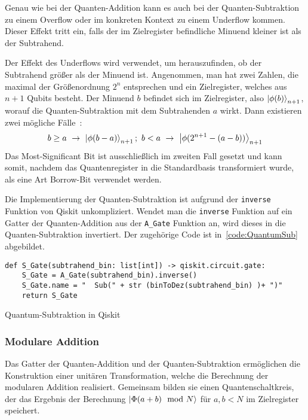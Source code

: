 Genau wie bei der Quanten-Addition kann es auch bei der Quanten-Subtraktion zu einem Overflow
oder im konkreten Kontext zu einem Underflow kommen.
Dieser Effekt tritt ein, 
falls der im Zielregister befindliche Minuend kleiner ist als der Subtrahend.

Der Effekt des Underflows wird verwendet, um herauszufinden, 
ob der Subtrahend größer als der Minuend ist.
Angenommen, man hat zwei Zahlen, 
die maximal der Größenordnung \(2^n\) entsprechen und 
ein Zielregister, 
welches aus \(n+1\) Qubits besteht.
Der Minuend \(b\) befindet sich im Zielregister, 
also \(\ket{\phi(b)}_{n+1}\), 
worauf die Quanten-Subtraktion mit dem Subtrahenden \(a\) wirkt.
Dann existieren zwei mögliche Fälle~\cite{beauregard2003circuit}:
\[b \geq a~\rightarrow~\ket{\phi(b-a)}_{n+1};~
b < a~\rightarrow~\ket{\phi(2^{n+1}-(a-b))}_{n+1}
  \]
Das Most-Significant Bit ist ausschließlich im zweiten Fall gesetzt und kann somit, 
nachdem das Quantenregister in die Standardbasis transformiert wurde, 
als eine Art Borrow-Bit verwendet werden.

Die Implementierung der Quanten-Subtraktion ist aufgrund der \texttt{inverse} Funktion von Qiskit unkompliziert.
Wendet man die \texttt{inverse} Funktion auf ein Gatter der Quanten-Addition aus der \texttt{A\_Gate} Funktion an, 
wird dieses in die Quanten-Subtraktion invertiert.
Der zugehörige Code ist in~\ref{code:QuantumSub} abgebildet.
\begin{listing}[H]
\begin{verbatim}    
def S_Gate(subtrahend_bin: list[int]) -> qiskit.circuit.gate:
    S_Gate = A_Gate(subtrahend_bin).inverse()
    S_Gate.name = "  Sub(" + str (binToDez(subtrahend_bin) )+ ")"
    return S_Gate
  \end{verbatim}
  \caption{Quantum-Subtraktion in Qiskit}
  \label{code:QuantumSub}
\end{listing}

\subsubsection{Modulare Addition} \label{sub:modulareAddition}
Das Gatter der Quanten-Addition und der Quanten-Subtraktion ermöglichen die Konstruktion einer unitären Transformation, 
welche die Berechnung der modularen Addition realisiert.
Gemeinsam bilden sie einen Quantenschaltkreis, 
der das Ergebnis der Berechnung \(\ket{\Phi(a+b)\mod N}\) für \(a, b < N\) im Zielregister speichert.

